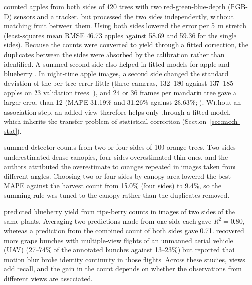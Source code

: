 \citet{felippomes2026video} counted apples from both sides of 420 trees with two red-green-blue-depth (RGB-D) sensors and a tracker, but processed the two sides independently, without matching fruit between them. Using both sides lowered the error per 5~m stretch (least-squares mean RMSE 46.73 apples against 58.69 and 59.36 for the single sides). Because the counts were converted to yield through a fitted correction, the duplicates between the sides were absorbed by the calibration rather than identified. A summed second side also helped in fitted models for apple and blueberry \citep{qian2013yield,li2023blueberry}. In night-time apple images, a second side changed the standard deviation of the per-tree error little (three cameras, 132--180 against 137--185 apples on 23 validation trees; \citealp{linker2017procedure}), and 24 or 36 frames per mandarin tree gave a larger error than 12 (MAPE 31.19\% and 31.26\% against 28.63\%; \citealp{isobe2025mandarin}). Without an association step, an added view therefore helps only through a fitted model, which inherits the transfer problem of statistical correction (Section~\ref{sec:mech-stat}).

\citet{mirhaji2021fruit} summed detector counts from two or four sides of 100 orange trees. Two sides underestimated dense canopies, four sides overestimated thin ones, and the authors attributed the overestimate to oranges repeated in images taken from different angles. Choosing two or four sides by canopy area lowered the best MAPE against the harvest count from 15.0\% (four sides) to 9.4\%, so the summing rule was tuned to the canopy rather than the duplicates removed.

\citet{singh2025development} predicted blueberry yield from ripe-berry counts in images of two sides of the same plants. Averaging two predictions made from one side each gave $R^2=0.80$, whereas a prediction from the combined count of both sides gave 0.71. \citet{arizasentis2025comparative} recovered more grape bunches with multiple-view flights of an unmanned aerial vehicle (UAV) (27--74\% of the annotated bunches against 13--23\%) but reported that motion blur broke identity continuity in those flights. Across these studies, views add recall, and the gain in the count depends on whether the observations from different views are associated.


